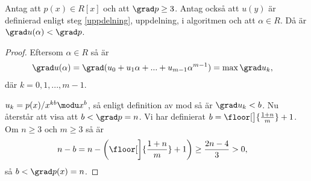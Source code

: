 \begin{lemma}
  \label{lemma:1}
  Antag att $p(x) \in R[x]$ och att $\grad p \geq 3$. Antag också att $u(y)$ är
  definierad enligt steg \ref{uppdelning}, uppdelning, i algoritmen och att
  $\alpha \in R$. Då är $\grad u(\alpha) < \grad p$.
\end{lemma}
\begin{proof}
  Eftersom $\alpha \in R$ så är
  \begin{align*}
    \grad u(\alpha) &= \grad (u_0 + u_1 \alpha + ... + u_{m-1}\alpha^{m-1}) = \max \grad u_k,
  \end{align*}
  där $k={0,1,...,m-1}$.

  \bigskip\noindent
  $u_k = p(x)/x^{k b} \modu x^b$, så enligt definition av mod så är $\grad u_k
  < b$. Nu återstår att visa att $b < \grad p = n$. Vi har definierat $b =
  \floor[\big]{\frac{1 + n}{m}} + 1$. Om $n \geq 3$ och $m \geq 3$ så är
  \begin{align*}
    n-b &= n - \left( \floor[\bigg]{\frac{1 + n}{m}} + 1 \right) \geq \frac{2n-4}{3} > 0,
  \end{align*}
  så $b < \grad p(x) = n$.
\end{proof}

